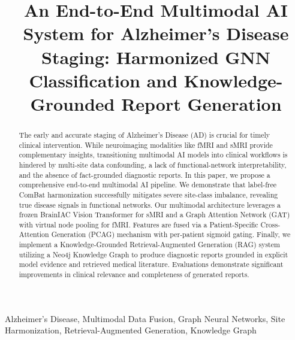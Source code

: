 \documentclass[conference]{IEEEtran}
\begin{document}
\title{An End-to-End Multimodal AI System for Alzheimer's Disease Staging: Harmonized GNN Classification and Knowledge-Grounded Report Generation}

\author{
\and
{}
}

\maketitle

\begin{abstract}
The early and accurate staging of Alzheimer's Disease (AD) is crucial for timely clinical intervention. While neuroimaging modalities like fMRI and sMRI provide complementary insights, transitioning multimodal AI models into clinical workflows is hindered by multi-site data confounding, a lack of functional-network interpretability, and the absence of fact-grounded diagnostic reports. In this paper, we propose a comprehensive end-to-end multimodal AI pipeline. We demonstrate that label-free ComBat harmonization successfully mitigates severe site-class imbalance, revealing true disease signals in functional networks. Our multimodal architecture leverages a frozen BrainIAC Vision Transformer for sMRI and a Graph Attention Network (GAT) with virtual node pooling for fMRI. Features are fused via a Patient-Specific Cross-Attention Generation (PCAG) mechanism with per-patient sigmoid gating. Finally, we implement a Knowledge-Grounded Retrieval-Augmented Generation (RAG) system utilizing a Neo4j Knowledge Graph to produce diagnostic reports grounded in explicit model evidence and retrieved medical literature. Evaluations demonstrate significant improvements in clinical relevance and completeness of generated reports.
\end{abstract}

\begin{IEEEkeywords}
Alzheimer's Disease, Multimodal Data Fusion, Graph Neural Networks, Site Harmonization, Retrieval-Augmented Generation, Knowledge Graph
\end{IEEEkeywords}
\end{document}

